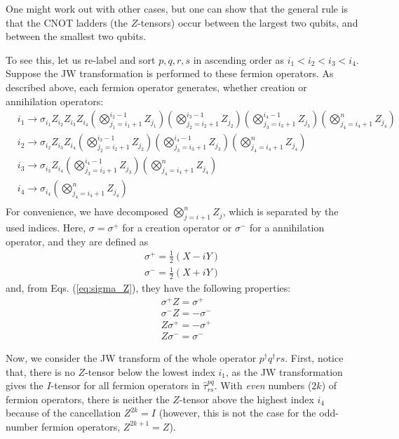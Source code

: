 \documentclass[prb,amsmath,amsfonts,amssymb]{revtex4}
\newcommand{\red}{\color{red}{}}
\newcommand{\black}{\color{black}{}}
\begin{document}
One might work out with other cases, but one can show that \red the general rule is that the CNOT ladders (the $Z$-tensors) occur between the largest two qubits, and between the smallest two qubits. \black 


To see this, let us re-label and sort $p,q,r,s$ in ascending order as $i_1 < i_2 < i_3 < i_4$. Suppose the JW transformation is performed to these fermion operators. As described above, each fermion operator generates, whether creation or annihilation operators:
\begin{align}
	&{i_1} \rightarrow \sigma_{i_1} Z_{i_2} Z_{i_3} Z_{i_4}\left(\bigotimes_{j_1=i_1+1}^{i_2-1} Z_{j_1}\right) \left(\bigotimes_{j_2=i_2+1}^{i_3-1} Z_{j_2}\right)\left(\bigotimes_{j_3=i_3+1}^{i_4-1} Z_{j_3}\right)\left(\bigotimes_{j_4=i_4+1}^{n} Z_{j_4}\right)\\
	&{i_2} \rightarrow \sigma_{i_2}Z_{i_3}Z_{i_4}\left(\bigotimes_{j_2=i_2+1}^{i_3-1} Z_{j_2}\right)\left(\bigotimes_{j_3=i_3+1}^{i_4-1} Z_{j_3}\right)\left(\bigotimes_{j_4=i_4+1}^{n} Z_{j_4}\right)\\
	&{i_3} \rightarrow \sigma_{i_3}  Z_{i_4} \left(\bigotimes_{j_3=i_3+1}^{i_4-1} Z_{j_3}\right)\left(\bigotimes_{j_4=i_4+1}^{n} Z_{j_4}\right)\\
	&{i_4} \rightarrow \sigma_{i_4} \left(\bigotimes_{j_4=i_4+1}^{n} Z_{j_4}\right)\\	
\end{align}
For convenience, we have decomposed $\bigotimes_{j=i+1}^n Z_j$, which is separated by the used indices. Here, $\sigma = \sigma^+$ for a creation operator or $\sigma^-$ for a annihilation operator, and they are defined as
\begin{align}
	\sigma^+ = \frac{1}{2}\left(X - i Y\right)\\
	\sigma^- = \frac{1}{2}\left(X + i Y\right)	
\end{align}
and, from Eqs. (\ref{eq:sigma_Z}), they have the following properties:
\begin{subequations}
	\begin{align}
	&\sigma^+ Z = \sigma^+ \\
	&\sigma^- Z = -\sigma^-\\
	&Z\sigma^+ = -\sigma^+ \\
	&Z\sigma^- = \sigma^-
	\end{align}
\label{eq:sigma_Z}
\end{subequations}

Now, we consider the JW transform of the whole operator $p^\dag q^\dag r s$. First, notice that, there is no $Z$-tensor below the lowest index $i_1$, as the JW transformation gives the $I$-tensor for all fermion operators in $\hat \tau_{rs}^{pq}$. With {\it even} numbers  ($2k$) of fermion operators, there is neither the $Z$-tensor above the highest index $i_4$ because of the  cancellation $Z^{2k} = I$ (however, this is not the case for the odd-number fermion operators, $Z^{2k+1} = Z$). 
\end{document}
